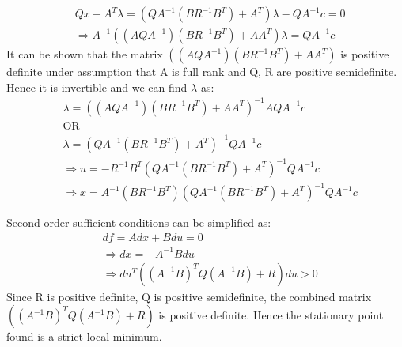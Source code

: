 \begin{enumerate}
\begin{enumerate}
\begin{align*}
   &Qx + A^T \lambda = (Q A^{-1} (B R^{-1} B^T) + A^T)\lambda  - Q A^{-1}c = 0\\
   &\Rightarrow A^{-1}((AQA^{-1}) (B R^{-1} B^T) + A A^T) \lambda = Q A^{-1}c
  \end{align*}
  It can be shown that  the matrix $((AQA^{-1}) (B R^{-1} B^T) + A A^T)$ is positive definite under assumption that A is full rank and Q, R are positive semidefinite. Hence it is invertible and we can find $\lambda$ as:
  \begin{align*}
   &\lambda = ((AQA^{-1}) (B R^{-1} B^T) + A A^T)^{-1} AQA^{-1}c\\
   &\text{OR}\\
   &\lambda = (Q A^{-1} (B R^{-1} B^T) + A^T)^{-1} QA^{-1}c\\
   &\Rightarrow u = -R^{-1} B^T (Q A^{-1} (BR^{-1} B^T) + A^T)^{-1} QA^{-1}c\\
   &\Rightarrow x = A^{-1}(B R^{-1} B^T ) (Q A^{-1} (BR^{-1} B^T) + A^T)^{-1} QA^{-1}c
  \end{align*}
  
  Second order sufficient conditions can be simplified as:
  \begin{align*}
    &df = A dx + B du = 0\\ 
    &\Rightarrow dx = -A^{-1} B du \\
    &\Rightarrow du^T \left((A^{-1}B)^T Q (A^{-1}B) + R\right) du > 0
  \end{align*}
  Since R is positive definite, Q is positive semidefinite, the combined matrix \\$((A^{-1}B)^T Q (A^{-1}B) + R)$ is positive definite. Hence the stationary point found is a strict local minimum.
  

\end{enumerate}
\end{enumerate}
